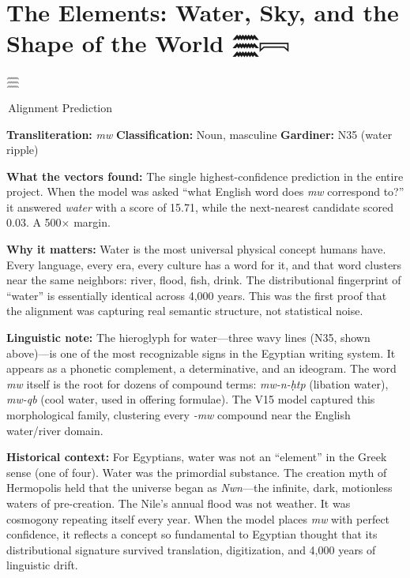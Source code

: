 \documentclass[11pt, a4paper]{article}
\newcommand{\hiero}[1]{{\normalfont\hierofont #1}}
\newcommand{\bighiero}[1]{{\normalfont\hierofont\fontsize{48}{56}\selectfont #1}}
\newcommand{\displayglyph}[1]{%
  \begin{center}
  \bighiero{#1}
  \end{center}
  \vspace{-6pt}
}
\newcommand{\methodtag}[1]{%
  \noindent\colorbox{tagbg}{\small\sffamily\color{nightsky}\,#1\,}\par\smallskip%
}
\newenvironment{insightbox}[1][]{%
  \def\boxtitle{#1}%
  \begin{oframed}%
  \noindent{\bfseries\color{lapis}\boxtitle}\par\smallskip%
}{%
  \end{oframed}%
}
\begin{document}
\tableofcontents
\newpage

\section{The Elements: Water, Sky, and the Shape of the World \hfill \hiero{𓈗𓇯}}

\begin{insightbox}[\textit{mw} --- Water \hfill Confidence: 15.71]

\displayglyph{𓈗}

\methodtag{Alignment Prediction}

\textbf{Transliteration:} \textit{mw} \quad
\textbf{Classification:} Noun, masculine \quad
\textbf{Gardiner:} N35 (water ripple)

\medskip
\textbf{What the vectors found:} The single highest-confidence prediction in the entire project. When the model was asked ``what English word does \textit{mw} correspond to?'' it answered \textit{water} with a score of 15.71, while the next-nearest candidate scored 0.03. A 500$\times$ margin.

\medskip
\textbf{Why it matters:} Water is the most universal physical concept humans have. Every language, every era, every culture has a word for it, and that word clusters near the same neighbors: river, flood, fish, drink. The distributional fingerprint of ``water'' is essentially identical across 4,000 years. This was the first proof that the alignment was capturing real semantic structure, not statistical noise.

\medskip
\textbf{Linguistic note:} The hieroglyph for water---three wavy lines (N35, shown above)---is one of the most recognizable signs in the Egyptian writing system. It appears as a phonetic complement, a determinative, and an ideogram. The word \textit{mw} itself is the root for dozens of compound terms: \textit{mw-n-ḥtp} (libation water), \textit{mw-qb} (cool water, used in offering formulae). The V15 model captured this morphological family, clustering every \textit{-mw} compound near the English water/river domain.

\medskip
\textbf{Historical context:} For Egyptians, water was not an ``element'' in the Greek sense (one of four). Water was the primordial substance. The creation myth of Hermopolis held that the universe began as \textit{Nwn}---the infinite, dark, motionless waters of pre-creation. The Nile's annual flood was not weather. It was cosmogony repeating itself every year. When the model places \textit{mw} with perfect confidence, it reflects a concept so fundamental to Egyptian thought that its distributional signature survived translation, digitization, and 4,000 years of linguistic drift.
\end{insightbox}
\end{document}
